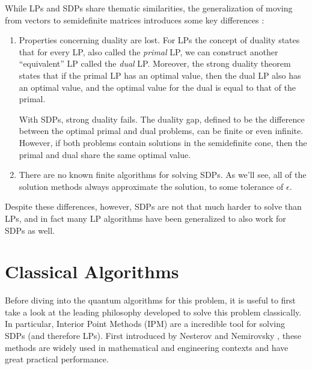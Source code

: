 \documentclass[11pt]{article}
\begin{document}
	While LPs and SDPs share thematic similarities, the generalization of moving from vectors to semidefinite matrices
	introduces some key differences \cite{freundIntroductionSemidefiniteProgramming}:
	\begin{enumerate}[label=\arabic*.]
		\item Properties concerning duality are lost. For LPs the concept of duality states that for every 
			LP, also called the \textit{primal} LP, 
			we can construct another ``equivalent'' LP called the \textit{dual} LP. Moreover, the strong 
			duality theorem states that if the primal LP has an optimal value, then the dual LP also has an optimal 
			value, and the optimal value for the dual is equal to that of the primal.   

			With SDPs, strong duality fails. The duality gap, defined to be the difference between the optimal 
			primal and dual problems, can be finite or even infinite. However, if both problems contain solutions in 
			the semidefinite cone, then the primal and dual share the same optimal value.  
		\item There are no known finite algorithms for solving SDPs. As we'll see, all of the solution methods 
			always approximate the solution, to some tolerance of \( \epsilon \).        
	\end{enumerate}
	Despite these differences, however, SDPs are not that much harder to solve than LPs, and in fact many LP 
	algorithms have been generalized to also work for SDPs as well.  

	\section{Classical Algorithms}
 \label{Classical Algorithms}
	Before diving into the quantum algorithms for this problem, it is useful to first take a look at the leading 
	philosophy developed to solve this problem classically. In particular, Interior Point Methods (IPM) are a incredible tool for solving SDPs (and therefore LPs). First introduced by Nesterov and Nemirovsky \cite{nesterov1994interior}, these methods are widely used in mathematical and engineering contexts and have great practical performance. 
\end{document}
